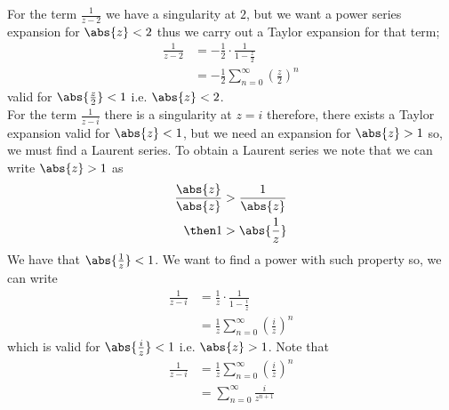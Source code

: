 \documentclass[12pt, a4paper]{article}
\begin{document}
\begin{example}
\begin{solution}
\begin{enumerate}
\begin{figure}[H]
\begin{center}
{
                       }
                \end{center}
           \end{figure}
           For the term \(\frac{1}{z-2}\) we have a singularity at \(2\), but we want a power series expansion for \(\abs{z}<2\) thus we carry out a Taylor expansion for that term;
            \[\begin{aligned}
                \frac{1}{z-2} &= -\frac{1}{2} \cdot \frac{1}{1-\frac{z}{2}} \\
                &= -\frac{1}{2} \sum_{n=0}^{\infty} \left( \frac{z}{2} \right)^n 
            \end{aligned}\]
            valid for \(\abs{\frac{z}{2}}<1\) i.e. \(\abs{z}<2\). \\
            For the term \(\frac{1}{z-i}\) there is a singularity at \(z=i\) therefore, there exists a Taylor expansion valid for \(\abs{z}<1\), but we need an expansion for \(\abs{z}>1\) so, we must find a Laurent series. To obtain a Laurent series we note that we can write \(\abs{z}>1\) as 
            \[\begin{aligned}
                \frac{\abs{z}}{\abs{z}}&> \frac{1}{\abs{z}}  \\
                \then 1 &>\abs{\frac{1}{z}}
            \end{aligned}\]
            We have that \(\abs{\frac{1}{z}}<1\). We want to find a power with such property so, we can write 
            \[\begin{aligned}
                \frac{1}{z-i} &= \frac{1}{z} \cdot \frac{1}{1-\frac{i}{z}} \\
                &= \frac{1}{z} \sum_{n=0}^{\infty} \left( \frac{i}{z} \right)^n
            \end{aligned}\]
            which is valid for \(\abs{\frac{i}{z}}<1\) i.e. \(\abs{z}>1\). Note that 
            \[\begin{aligned}
                \frac{1}{z-i} &= \frac{1}{z} \sum_{n=0}^{\infty} \left( \frac{i}{z} \right)^n \\
                &= \sum_{n=0}^{\infty} \frac{i}{z^{n+1}} \\

\end{aligned}\]
\end{enumerate}
\end{solution}
\end{example}
\end{document}
